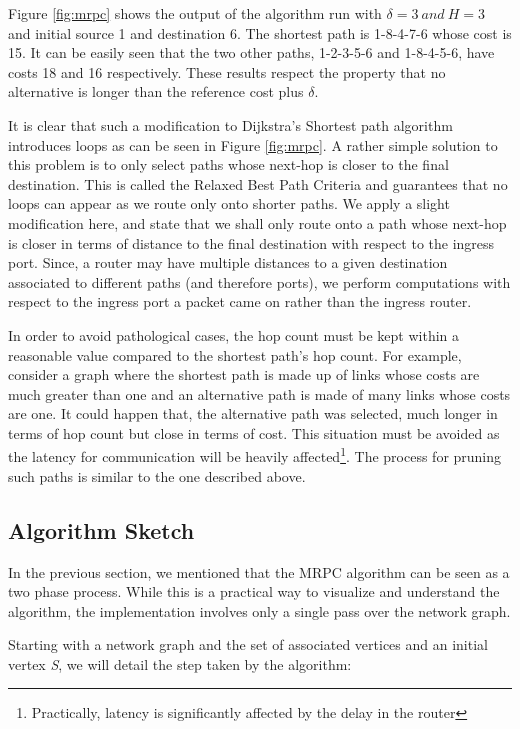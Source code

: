 Figure \ref{fig:mrpc} shows the output of the algorithm run with $\delta =
3~and~H = 3$ and initial source 1 and destination 6. The shortest path is  
1-8-4-7-6 whose cost is 15. It can be easily seen that the two other paths,
1-2-3-5-6 and 1-8-4-5-6, have costs 18 and 16 respectively. These results
respect the property that no alternative is longer than the reference cost plus
$\delta$.

It is clear that such a modification to Dijkstra's Shortest path algorithm
introduces loops as can be seen in Figure \ref{fig:mrpc}. A rather simple
solution to this problem is to only select paths whose next-hop is closer to
the final destination. This is called the Relaxed Best Path Criteria and
guarantees that no loops can appear as we route only onto shorter paths. We
apply a slight modification here, and
state that we shall only route onto a path whose next-hop is closer in terms of
distance to the final destination with respect to the ingress port. Since, a router may have multiple distances to a given destination associated to different paths (and therefore ports), we perform computations with respect to the ingress port a packet came on rather than the ingress router.


In order to avoid pathological cases, the hop count must be kept within a
reasonable value compared to the shortest path's hop count. For example, consider a
graph where the shortest path is made up of links whose costs are much greater
than one and an alternative path is made of many links whose costs are one. It
could happen that, the alternative path was selected, much longer in terms of
hop count but close in terms of cost. This situation must be avoided as the
latency for communication will be heavily affected\footnote{Practically,
latency is significantly affected by the delay in the router}. The process for
pruning such paths is similar to the one described above.

\subsection{Algorithm Sketch}

In the previous section, we mentioned that the MRPC algorithm can be seen as a
two phase process. While this is a practical way to visualize and understand
the algorithm, the implementation involves only a single pass over the network
graph.

Starting with a network graph and the set of associated vertices and an initial
vertex \textit{S}, we will detail the step taken by the algorithm:

